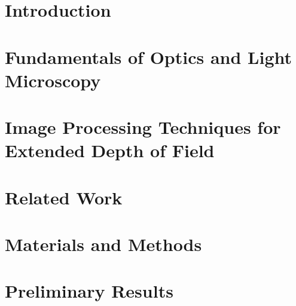 \documentclass[mestrado, qualificacao]{packages/icmc}
\begin{document}
\textual

\chapter{Introduction}
\label{chapter:introduction}


\chapter{Fundamentals of Optics and Light Microscopy}
\label{chapter:fundamentals-of-optics-and-light-microscopy}


\chapter{Image Processing Techniques for Extended Depth of Field}
\label{chapter:image-processing}


\chapter{Related Work}
\label{chapter:related-work}


\chapter{Materials and Methods}
\label{chapter:materials-and-methods}


\chapter{Preliminary Results}
\label{chapter:preliminary-results}


% 

% 
\end{document}
